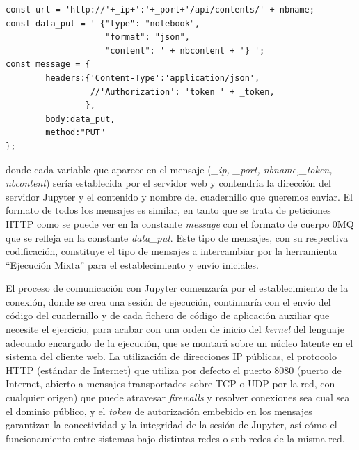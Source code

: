 \begin{minipage}{\linewidth}
\begin{lstlisting}[caption=Formato de Mensajes de ``Ejecución Mixta'']
const url = 'http://'+_ip+':'+_port+'/api/contents/' + nbname;
const data_put = ' {"type": "notebook",
                    "format": "json",
                    "content": ' + nbcontent + '} ';
const message = {
        headers:{'Content-Type':'application/json',
                 //'Authorization': 'token ' + _token,
                },
        body:data_put,
        method:"PUT"
};
\end{lstlisting}
\end{minipage}

donde cada variable que aparece en el mensaje (\textit{\_ip, \_port, nbname,\_token, nbcontent}) sería establecida por el servidor web y contendría la dirección del servidor Jupyter y el contenido y nombre del cuadernillo que queremos enviar. El formato de todos los mensajes es similar, en tanto que se trata de peticiones HTTP como se puede ver en la constante \textit{message} con el formato de cuerpo 0MQ que se refleja en la constante \textit{data\_put}. Este tipo de mensajes, con su respectiva codificación, constituye el tipo de mensajes a intercambiar por la herramienta ``Ejecución Mixta'' para el establecimiento y envío iniciales.

El proceso de comunicación con Jupyter comenzaría por el establecimiento de la conexión, donde se crea una sesión de ejecución, continuaría con el envío del código del cuadernillo y de cada fichero de código de aplicación auxiliar que necesite el ejercicio, para acabar con una orden de inicio del \textit{kernel} del lenguaje adecuado encargado de la ejecución, que se montará sobre un núcleo latente en el sistema del cliente web. La utilización de direcciones IP públicas, el protocolo HTTP (estándar de Internet) que utiliza por defecto el puerto 8080 (puerto de Internet, abierto a mensajes transportados sobre TCP o UDP por la red, con cualquier origen) que puede atravesar \textit{firewalls} y resolver conexiones sea cual sea el dominio público, y el \textit{token} de autorización embebido en los mensajes garantizan la conectividad y la integridad de la sesión de Jupyter, así cómo el funcionamiento entre sistemas bajo distintas redes o sub-redes de la misma red.

